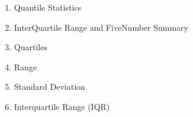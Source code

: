 \documentclass[]{report}
\begin{document}



\begin{multicols}{2}
\begin{enumerate}
\item Quantile Statistics
\item InterQuartile Range and FiveNumber Summary

\item Quartiles
\item Range
\item Standard Deviation
\item Interquartile Range (IQR)
\end{enumerate}
\end{multicols}
\end{document}
